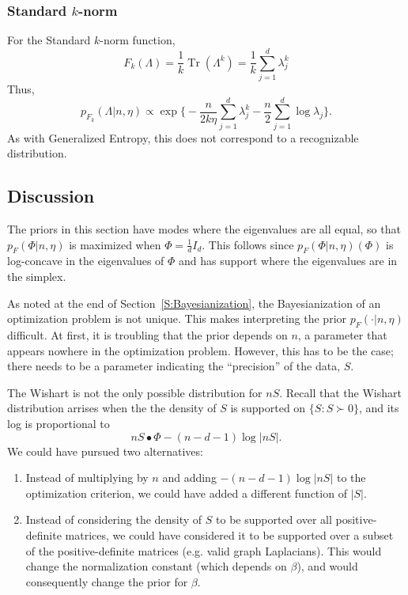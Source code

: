 \documentclass[11pt]{article}
\DeclareMathOperator*{\Tr}{Tr}
\begin{document}
\subsubsection*{Standard $k$-norm}

For the Standard $k$-norm function,
\[
    F_k(\Lambda)
        = \frac{1}{k} \Tr(\Lambda^k)
        = \frac{1}{k} \sum_{j=1}^d \lambda_j^k
\]
Thus,
\[
    p_{F_k}(\Lambda | n, \eta)
        \propto
            \exp\Big\{
                -
                \frac{n}{2k \eta}
                \sum_{j=1}^{d} \lambda_j^k
                -
                \frac{n}{2}
                \sum_{j=1}^{d} \log \lambda_j
            \Big\}.
\]
As with Generalized Entropy, this does not correspond to a recognizable
distribution.


\subsection{Discussion}

The priors in this section have modes where the eigenvalues are all equal,
so that $p_F(\Phi|n, \eta)$ is maximized when $\Phi = \tfrac{1}{d} I_d$.  This
follows since $p_F(\Phi|n, \eta)(\Phi)$ is log-concave in the eigenvalues of
$\Phi$ and has support where the eigenvalues are in the simplex.

As noted at the end of Section~\ref{S:Bayesianization}, the Bayesianization of
an optimization problem is not unique.  This makes interpreting the prior
$p_F(\cdot | n, \eta)$ difficult.  At first, it is troubling that the prior
depends on $n$, a parameter that appears nowhere in the optimization problem.
However, this has to be the case; there needs to be a parameter indicating
the ``precision'' of the data, $S$.

The Wishart is not the only possible distribution for $n S$.  Recall that the
Wishart distribution arrises when the the density of $S$ is supported on
$\{ S : S \succ 0 \}$, and its log is proportional to
\[
    n S \bullet \Phi
        - (n-d-1) \log |n S|.
\]
We could have pursued two alternatives:
\begin{enumerate}
    \item Instead of multiplying by $n$ and adding $-(n-d-1) \log |n S|$ to the
        optimization criterion, we could have added a different function of
        $|S|$.
    \item Instead of considering the density of $S$ to be supported over
        all positive-definite matrices, we could have considered it to be
        supported over a subset of the positive-definite matrices
        (e.g. valid graph Laplacians).  This would change the normalization
        constant (which depends on $\beta$), and would consequently change the
        prior for $\beta$.
\end{enumerate}
\end{document}
